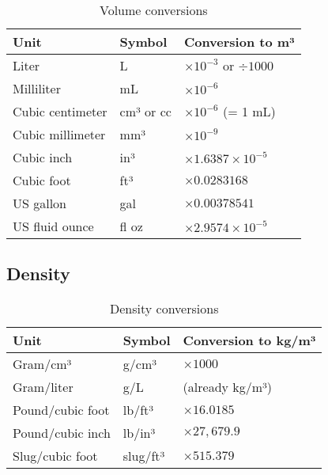 \begin{table}[H]
\centering
\begin{tabular}{|l|l|l|}
\hline
\rowcolor{blue!20}
\textbf{Unit} & \textbf{Symbol} & \textbf{Conversion to m³} \\
\hline
Liter & L & $\times 10^{-3}$ or $\div 1000$ \\
\hline
Milliliter & mL & $\times 10^{-6}$ \\
\hline
Cubic centimeter & cm³ or cc & $\times 10^{-6}$ (= 1 mL) \\
\hline
Cubic millimeter & mm³ & $\times 10^{-9}$ \\
\hline
\rowcolor{yellow!20}
Cubic inch & in³ & $\times 1.6387 \times 10^{-5}$ \\
\hline
\rowcolor{yellow!20}
Cubic foot & ft³ & $\times 0.0283168$ \\
\hline
\rowcolor{yellow!20}
US gallon & gal & $\times 0.00378541$ \\
\hline
\rowcolor{yellow!20}
US fluid ounce & fl oz & $\times 2.9574 \times 10^{-5}$ \\
\hline
\end{tabular}
\caption{Volume conversions}
\end{table}

\subsection{Density}

\begin{table}[H]
\centering
\begin{tabular}{|l|l|l|}
\hline
\rowcolor{blue!20}
\textbf{Unit} & \textbf{Symbol} & \textbf{Conversion to kg/m³} \\
\hline
Gram/cm³ & g/cm³ & $\times 1000$ \\
\hline
Gram/liter & g/L & (already kg/m³) \\
\hline
\rowcolor{yellow!20}
Pound/cubic foot & lb/ft³ & $\times 16.0185$ \\
\hline
\rowcolor{yellow!20}
Pound/cubic inch & lb/in³ & $\times 27{,}679.9$ \\
\hline
\rowcolor{yellow!20}
Slug/cubic foot & slug/ft³ & $\times 515.379$ \\
\hline
\end{tabular}
\caption{Density conversions}
\end{table}

